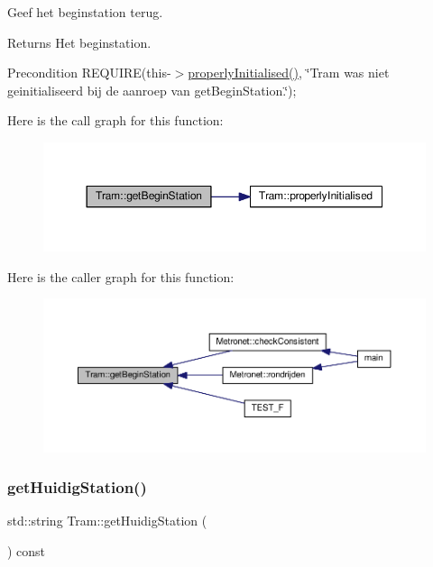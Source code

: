 Geef het beginstation terug. 

\begin{DoxyReturn}{Returns}
Het beginstation. 
\end{DoxyReturn}
\begin{DoxyPrecond}{Precondition}
R\+E\+Q\+U\+I\+RE(this-\/$>$\hyperlink{class_tram_ac2688f590e4db232b4f535c9bf959efb}{properly\+Initialised()}, \char`\"{}\+Tram was niet geinitialiseerd bij de aanroep van get\+Begin\+Station.\char`\"{}); 
\end{DoxyPrecond}
Here is the call graph for this function\+:\nopagebreak
\begin{figure}[H]
\begin{center}
\leavevmode
\includegraphics[width=350pt]{class_tram_ae4a7cf6313452140ed54d219d1f6afba_cgraph}
\end{center}
\end{figure}
Here is the caller graph for this function\+:\nopagebreak
\begin{figure}[H]
\begin{center}
\leavevmode
\includegraphics[width=350pt]{class_tram_ae4a7cf6313452140ed54d219d1f6afba_icgraph}
\end{center}
\end{figure}
\mbox{\label{class_tram_ae1d03c1fb6e0f5f97c57d35fe10fa8dd}} 
\subsubsection{\texorpdfstring{get\+Huidig\+Station()}{getHuidigStation()}}
{\footnotesize\ttfamily std\+::string Tram\+::get\+Huidig\+Station (\begin{DoxyParamCaption}{ }\end{DoxyParamCaption}) const}



